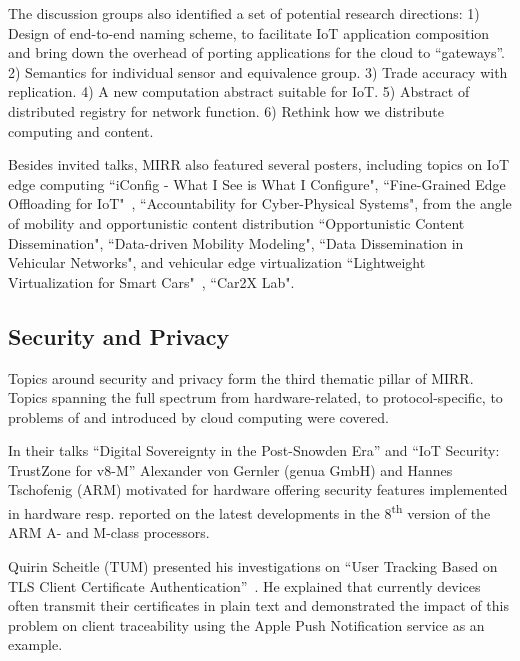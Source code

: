 The discussion groups also identified a set of potential
research directions: 1) Design of end-to-end naming scheme, to facilitate IoT
application composition and bring down the overhead of porting applications
for the cloud to ``gateways''. 2) Semantics for individual sensor and
equivalence group. 3) Trade accuracy with replication. 4) A new computation
abstract suitable for IoT. 5) Abstract of distributed registry for network
function. 6) Rethink how we distribute computing and content.

Besides invited talks, MIRR also featured several posters, including
topics on IoT edge computing ``iConfig - What I See is What I Configure",
``Fine-Grained Edge Offloading for IoT"~\cite{cozzolino:hotconnet:2017},
``Accountability for Cyber-Physical Systems", from the angle of 
mobility and opportunistic content distribution ``Opportunistic Content Dissemination",
``Data-driven Mobility Modeling",
``Data Dissemination in Vehicular Networks", and vehicular edge virtualization
``Lightweight Virtualization for Smart Cars"~\cite{rmorabito:im:2017},
``Car2X Lab".


\subsection{Security and Privacy}

Topics around security and privacy form the third thematic pillar of MIRR.
Topics spanning the full spectrum from hardware-related, to protocol-specific,
to problems of and introduced by cloud computing were covered.


In their talks ``Digital Sovereignty in the Post-Snowden Era'' and ``IoT
Security: TrustZone for v8-M'' Alexander von Gernler (genua GmbH) and Hannes
Tschofenig (ARM) motivated for hardware offering security features implemented
in hardware resp. reported on the latest developments in the
8\textsuperscript{th} version of the ARM A- and M-class processors.

Quirin Scheitle (TUM) presented his investigations on ``User Tracking Based on
TLS Client Certificate Authentication''~\cite{qscheitle:tma:2017}. He explained
that currently devices often transmit their certificates in plain text and
demonstrated the impact of this problem on client traceability using the Apple
Push Notification service as an example.

